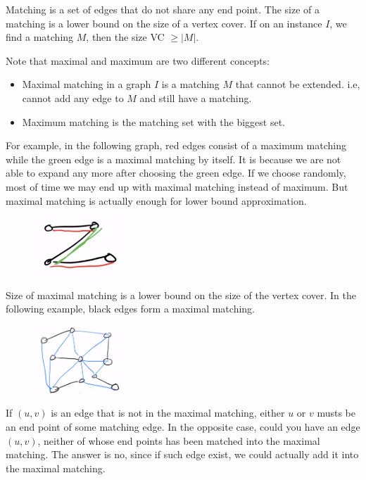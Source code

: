 Matching is a set of edges that do not share any end point. The size of a matching is a lower bound on the size of a vertex cover. If on an instance $I$, we find a matching $M$, then the size VC $\ge |M|$. 

Note that maximal and maximum are two different concepts:
\begin{itemize}
	\item Maximal matching in a graph $I$ is a matching $M$ that cannot be extended. i.e, cannot add any edge to $M$ and still have a matching.
	\item Maximum matching is the matching set with the biggest set.
\end{itemize}

For example, in the following graph, red edges consist of a maximum matching while the green edge is a maximal matching by itself. It is because we are not able to expand any more after choosing the green edge. If we choose randomly, most of time we may end up with maximal matching instead of maximum. But maximal matching is actually enough for lower bound approximation.
\begin{figure}[H]
	\centering
	\includegraphics[width=0.3\textwidth]{fig/vc-max.png}
\end{figure}
Size of maximal matching is a lower bound on the size of the vertex cover. In the following example, black edges form a maximal matching.
\begin{figure}[H]
	\centering
	\includegraphics[width=0.3\textwidth]{fig/vc-matching.png}
\end{figure}

If $(u, v)$ is an edge that is not in the maximal matching, either $u$ or $v$ musts be an end point of some matching edge. In the opposite case, could you have an edge $(u, v)$, neither of whose end points has been matched into the maximal matching. The answer is no, since if such edge exist, we could actually add it into the maximal matching.

